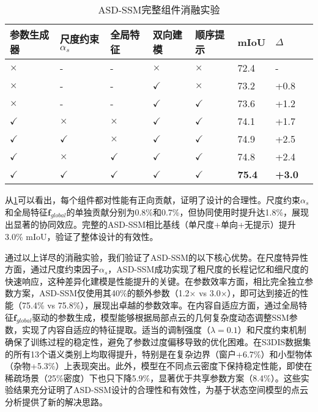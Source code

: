 \documentclass[preprint,12pt]{elsarticle}
\begin{document}
\begin{table}[htbp!]
	\centering
	\caption{ASD-SSM完整组件消融实验}
	\label{tab:asdssm_full_ablation}
	\begin{tabular}{@{}llllllll@{}}
		\toprule
		参数生成器 & 尺度约束$\alpha_s$ & 全局特征 & 双向建模 & 顺序提示 & mIoU & $\Delta$ \\ 
		\midrule
		$\times$ & - & - & $\times$ & $\times$ & 72.4 & - \\
		$\times$ & - & - & $\checkmark$ & $\times$ & 73.2 & +0.8 \\
		$\times$ & - & - & $\checkmark$ & $\checkmark$ & 73.6 & +1.2 \\
		\midrule
		$\checkmark$ & $\times$ & $\times$ & $\checkmark$ & $\checkmark$ & 74.1 & +1.7 \\
		$\checkmark$ & $\checkmark$ & $\times$ & $\checkmark$ & $\checkmark$ & 74.9 & +2.5 \\
		$\checkmark$ & $\times$ & $\checkmark$ & $\checkmark$ & $\checkmark$ & 74.8 & +2.4 \\
		\textbf{$\checkmark$} & \textbf{$\checkmark$} & \textbf{$\checkmark$} & \textbf{$\checkmark$} & \textbf{$\checkmark$} & \textbf{75.4} & \textbf{+3.0} \\
		\bottomrule
	\end{tabular}
\end{table}

从\cref{tab:asdssm_full_ablation}可以看出，每个组件都对性能有正向贡献，证明了设计的合理性。尺度约束$\alpha_s$和全局特征$\mathbf{f}_{global}$的单独贡献分别为0.8\%和0.7\%，但协同使用时提升达1.8\%，展现出显著的协同效应。完整的ASD-SSM相比基线（单尺度+单向+无提示）提升3.0\% mIoU，验证了整体设计的有效性。


通过以上详尽的消融实验，我们验证了ASD-SSM的以下核心优势。在尺度特异性方面，通过尺度约束因子$\alpha_s$，ASD-SSM成功实现了粗尺度的长程记忆和细尺度的快速响应，这种差异化建模是性能提升的关键。在参数效率方面，相比完全独立参数方案，ASD-SSM仅使用其40\%的额外参数（1.2$\times$ vs 3.0$\times$），即可达到接近的性能（75.4\% vs 75.8\%），展现出卓越的参数效率。在内容自适应方面，通过全局特征$\mathbf{f}_{global}$驱动的参数生成，模型能够根据局部点云的几何复杂度动态调整SSM参数，实现了内容自适应的特征提取。适当的调制强度（$\lambda=0.1$）和尺度约束机制确保了训练过程的稳定性，避免了参数过度偏移导致的优化困难。在S3DIS数据集的所有13个语义类别上均取得提升，特别是在复杂边界（窗户+6.7\%）和小型物体（杂物+5.3\%）上表现突出。此外，模型在不同点云密度下保持稳定性能，即使在稀疏场景（25\%密度）下也只下降5.9\%，显著优于共享参数方案（8.4\%）。这些实验结果充分证明了ASD-SSM设计的合理性和有效性，为基于状态空间模型的点云分析提供了新的解决思路。
\end{document}
